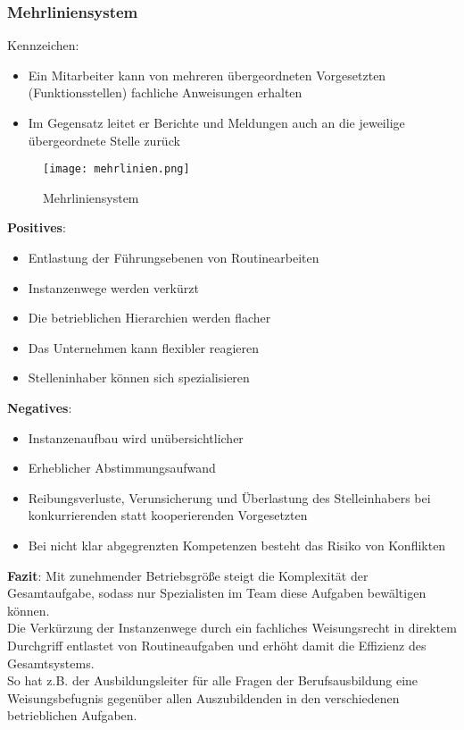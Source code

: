 \documentclass[asp1.tex]{subfiles}
\begin{document}
\subsubsection{Mehrliniensystem}
Kennzeichen:
\begin{itemize}
    \item Ein Mitarbeiter kann von mehreren übergeordneten Vorgesetzten (Funktionsstellen) fachliche Anweisungen erhalten
    \item Im Gegensatz leitet er Berichte und Meldungen auch an die jeweilige übergeordnete Stelle zurück
\end{itemize}
\begin{figure}[H]
    \begin{center}
        \texttt{[image: mehrlinien.png]}
    \end{center}
    \caption{Mehrliniensystem}
    \label{fig:Mehrliniensystemm}
\end{figure}
\textbf{Positives}:
\begin{itemize}
    \item Entlastung der Führungsebenen von Routinearbeiten
    \item Instanzenwege werden verkürzt
    \item Die betrieblichen Hierarchien werden flacher
    \item Das Unternehmen kann flexibler reagieren
    \item Stelleninhaber können sich spezialisieren
\end{itemize}
\textbf{Negatives}:
\begin{itemize}
    \item Instanzenaufbau wird unübersichtlicher
    \item Erheblicher Abstimmungsaufwand
    \item Reibungsverluste, Verunsicherung und Überlastung des Stelleinhabers bei konkurrierenden statt kooperierenden Vorgesetzten
    \item Bei nicht klar abgegrenzten Kompetenzen besteht das Risiko von Konflikten
\end{itemize}
\textbf{Fazit}:
Mit zunehmender Betriebsgröße steigt die Komplexität der Gesamtaufgabe, sodass nur Spezialisten im Team diese Aufgaben bewältigen können. \\
Die Verkürzung der Instanzenwege durch ein fachliches Weisungsrecht in direktem Durchgriff entlastet von Routineaufgaben und erhöht damit die Effizienz des Gesamtsystems. \\
So hat z.B. der Ausbildungsleiter für alle Fragen der Berufsausbildung eine Weisungsbefugnis gegenüber allen Auszubildenden in den verschiedenen betrieblichen Aufgaben.
\end{document}
